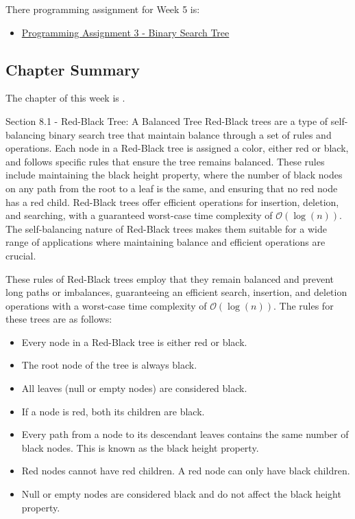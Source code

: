 There programming assignment for Week 5 is:

\begin{itemize}
    \item \href{https://github.com/QuantumCompiler/CU/tree/main/CSPB%202270%20-%20Data%20Structures/CSPB%202270%20-%20Programming%20Assignments/CSPB%202270%20-%20Assignment%203%20-%20Binary%20Search%20Tree}{Programming Assignment 3 - Binary Search Tree}
\end{itemize}

\subsection{Chapter Summary}

The chapter of this week is .

\begin{notes}{Section 8.1 - Red-Black Tree: A Balanced Tree}
    Red-Black trees are a type of self-balancing binary search tree that maintain balance through a set of rules and operations. Each node in a Red-Black tree is assigned a color, either red or black, and follows specific rules that ensure the tree remains balanced. These rules include maintaining the black height property, where the number of black 
    nodes on any path from the root to a leaf is the same, and ensuring that no red node has a red child. Red-Black trees offer efficient operations for insertion, deletion, and searching, with a guaranteed worst-case time complexity of $\mathcal{O}(\log{(n)})$. The self-balancing nature of Red-Black trees makes them suitable for a wide range of applications where 
    maintaining balance and efficient operations are crucial.
    
    These rules of Red-Black trees employ that they remain balanced and prevent long paths or imbalances, guaranteeing an efficient search, insertion, and deletion operations with a worst-case time complexity of $\mathcal{O}(\log{(n)})$. The rules for these trees are as follows:
    
    \begin{itemize}
        \item Every node in a Red-Black tree is either red or black.
        \item The root node of the tree is always black.
        \item All leaves (null or empty nodes) are considered black.
        \item If a node is red, both its children are black.
        \item Every path from a node to its descendant leaves contains the same number of black nodes. This is known as the black height property.
        \item Red nodes cannot have red children. A red node can only have black children.
        \item Null or empty nodes are considered black and do not affect the black height property.
    \end{itemize}
\end{notes}

